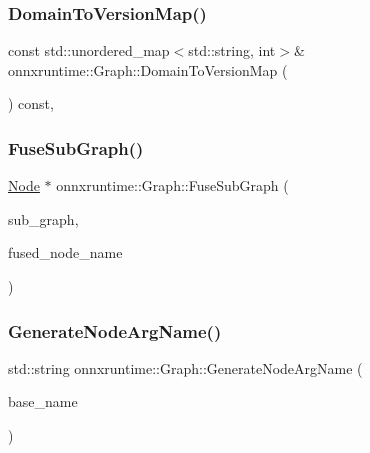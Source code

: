 \mbox{\label{classonnxruntime_1_1Graph_a46d1e58cbb0615f3e9733f15fb7aa1cc}} 
\subsubsection{\texorpdfstring{Domain\+To\+Version\+Map()}{DomainToVersionMap()}}
{\footnotesize\ttfamily const std\+::unordered\+\_\+map$<$std\+::string, int$>$\& onnxruntime\+::\+Graph\+::\+Domain\+To\+Version\+Map (\begin{DoxyParamCaption}{ }\end{DoxyParamCaption}) const\hspace{0.3cm}{\ttfamily [inline]}, {\ttfamily [noexcept]}}

\mbox{\label{classonnxruntime_1_1Graph_a4d09a87a881969281aaca973ec5bebd4}} 
\subsubsection{\texorpdfstring{Fuse\+Sub\+Graph()}{FuseSubGraph()}}
{\footnotesize\ttfamily \mbox{\hyperlink{classonnxruntime_1_1Node}{Node}} $\ast$ onnxruntime\+::\+Graph\+::\+Fuse\+Sub\+Graph (\begin{DoxyParamCaption}\item[{std\+::unique\+\_\+ptr$<$\+::\mbox{\hyperlink{structonnxruntime_1_1IndexedSubGraph}{onnxruntime\+::\+Indexed\+Sub\+Graph}} $>$}]{sub\+\_\+graph,  }\item[{const std\+::string \&}]{fused\+\_\+node\+\_\+name }\end{DoxyParamCaption})}

\mbox{\label{classonnxruntime_1_1Graph_a2c3e936d9d58b04ba1e7f93a9d41dab6}} 
\subsubsection{\texorpdfstring{Generate\+Node\+Arg\+Name()}{GenerateNodeArgName()}}
{\footnotesize\ttfamily std\+::string onnxruntime\+::\+Graph\+::\+Generate\+Node\+Arg\+Name (\begin{DoxyParamCaption}\item[{const std\+::string \&}]{base\+\_\+name }\end{DoxyParamCaption})}

